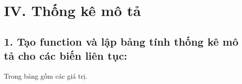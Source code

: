 \section{IV. Thống kê mô tả}
\label{iv.-thux1ed1ng-kuxea-muxf4-tux1ea3}

\subsection{1. Tạo function và lập bảng tính thống kê mô tả cho các biến liên tục:}

\begin{Shaded}
\begin{Highlighting}[]
\OtherTok{\textless{}{-}}\NormalTok{ data[, }\NormalTok{(}\NormalTok{, }\NormalTok{, }\NormalTok{, }
                      \NormalTok{, }\NormalTok{, }\NormalTok{, }
                      \NormalTok{, }\NormalTok{)] }
\end{Highlighting}
\end{Shaded}

Trong bảng gồm các giá trị.

